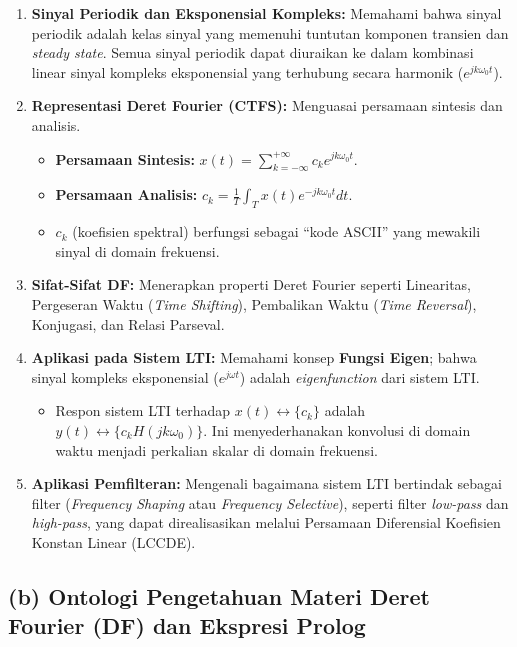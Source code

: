 \documentclass[
  letterpaper,
  DIV=11,
  numbers=noendperiod]{scrreprt}
\providecommand{\tightlist}{%
  \setlength{\itemsep}{0pt}\setlength{\parskip}{0pt}}
\begin{document}
\begin{enumerate}
\def\labelenumi{\arabic{enumi}.}
\tightlist
\item
  \textbf{Sinyal Periodik dan Eksponensial Kompleks:} Memahami bahwa
  sinyal periodik adalah kelas sinyal yang memenuhi tuntutan komponen
  transien dan \emph{steady state}. Semua sinyal periodik dapat
  diuraikan ke dalam kombinasi linear sinyal kompleks eksponensial yang
  terhubung secara harmonik (\(e^{jk\omega_0 t}\)).
\item
  \textbf{Representasi Deret Fourier (CTFS):} Menguasai persamaan
  sintesis dan analisis.

  \begin{itemize}
  \tightlist
  \item
    \textbf{Persamaan Sintesis:}
    \(x(t) = \sum_{k=-\infty}^{+\infty} c_k e^{jk\omega_0 t}\).
  \item
    \textbf{Persamaan Analisis:}
    \(c_k = \frac{1}{T} \int_T x(t) e^{-jk\omega_0 t} dt\).
  \item
    \(c_k\) (koefisien spektral) berfungsi sebagai ``kode ASCII'' yang
    mewakili sinyal di domain frekuensi.
  \end{itemize}
\item
  \textbf{Sifat-Sifat DF:} Menerapkan properti Deret Fourier seperti
  Linearitas, Pergeseran Waktu (\emph{Time Shifting}), Pembalikan Waktu
  (\emph{Time Reversal}), Konjugasi, dan Relasi Parseval.
\item
  \textbf{Aplikasi pada Sistem LTI:} Memahami konsep \textbf{Fungsi
  Eigen}; bahwa sinyal kompleks eksponensial (\(e^{j\omega t}\)) adalah
  \emph{eigenfunction} dari sistem LTI.

  \begin{itemize}
  \tightlist
  \item
    Respon sistem LTI terhadap \(x(t) \leftrightarrow \{c_k\}\) adalah
    \(y(t) \leftrightarrow \{c_k H(jk\omega_0)\}\). Ini menyederhanakan
    konvolusi di domain waktu menjadi perkalian skalar di domain
    frekuensi.
  \end{itemize}
\item
  \textbf{Aplikasi Pemfilteran:} Mengenali bagaimana sistem LTI
  bertindak sebagai filter (\emph{Frequency Shaping} atau
  \emph{Frequency Selective}), seperti filter \emph{low-pass} dan
  \emph{high-pass}, yang dapat direalisasikan melalui Persamaan
  Diferensial Koefisien Konstan Linear (LCCDE).
\end{enumerate}

\subsection{(b) Ontologi Pengetahuan Materi Deret Fourier (DF) dan
Ekspresi
Prolog}\label{b-ontologi-pengetahuan-materi-deret-fourier-df-dan-ekspresi-prolog}
\end{document}
